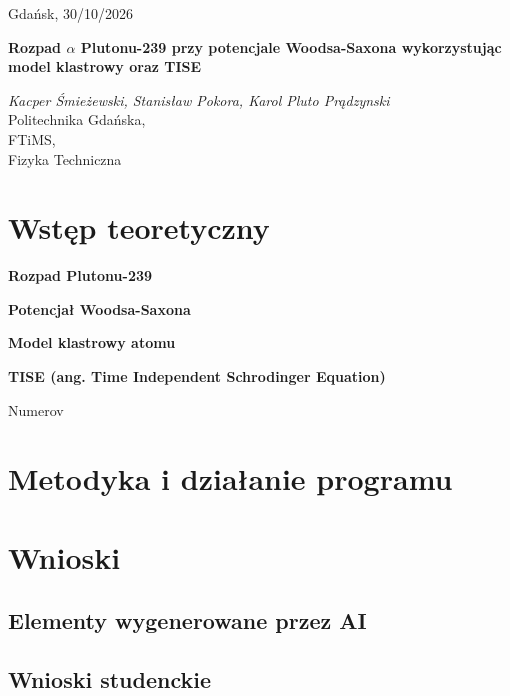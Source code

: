 \documentclass[a4paper,12pt]{article} %
\newcommand{\rTitle}{Rozpad $\alpha$ Plutonu-239 przy potencjale Woodsa-Saxona wykorzystując model klastrowy oraz TISE}
\newcommand{\studentName}{Kacper Śmieżewski, Stanisław Pokora, Karol Pluto Prądzynski}
\newcommand{\faculty}{FTiMS}
\newcommand{\fieldOfStudy}{Fizyka Techniczna}
\newcommand{\raportDate}{30/10/2026}
\begin{document}
    \begin{flushright}
    Gdańsk, \raportDate
    \end{flushright}
    \vspace{12pt}
    \textbf{\rTitle}\\
    \begin{flushleft}
     \textit{\studentName}\\ %
      Politechnika Gdańska,\\
      \faculty,\\ 
      \fieldOfStudy
    \end{flushleft}
\vspace{24pt}

\renewcommand{\thesection}{\Roman{section}}
\addtolength{\cftsecnumwidth}{1em}

\begin{abstract}
  lorem ipsum dolor
\end{abstract}

\section{Wstęp teoretyczny}
    
    \textbf{Rozpad Plutonu-239}
    
    \textbf{Potencjał Woodsa-Saxona}

    \textbf{Model klastrowy atomu}

    \textbf{TISE (ang. Time Independent Schrodinger Equation)}

    Numerov

\section{Metodyka i działanie programu}

\section{Wnioski}
\subsection{Elementy wygenerowane przez AI}
\subsection{Wnioski studenckie}





\printbibliography

\newpage
%  
\end{document}
